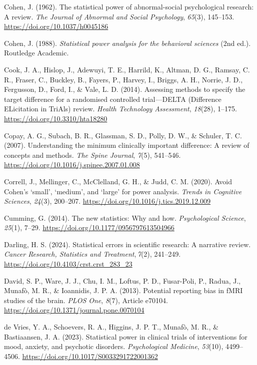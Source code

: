 \documentclass[authordate, meta, issue]{jote-new-article}
\begin{document}
	Cohen, J. (1962). The statistical power of abnormal-social psychological research: A review. \emph{The Journal of Abnormal and Social Psychology}, \emph{65}(3), 145--153. \url{https://doi.org/10.1037/h0045186}



	Cohen, J. (1988). \emph{Statistical power analysis for the behavioral sciences} (2nd ed.). Routledge Academic.



	Cook, J. A., Hislop, J., Adewuyi, T. E., Harrild, K., Altman, D. G., Ramsay, C. R., Fraser, C., Buckley, B., Fayers, P., Harvey, I., Briggs, A. H., Norrie, J. D., Fergusson, D., Ford, I., \& Vale, L. D. (2014). Assessing methods to specify the target difference for a randomised controlled trial—DELTA (Difference ELicitation in TriAls) review. \emph{Health Technology Assessment}, \emph{18}(28), 1--175. \url{https://doi.org/10.3310/hta18280}



	Copay, A. G., Subach, B. R., Glassman, S. D., Polly, D. W., \& Schuler, T. C. (2007). Understanding the minimum clinically important difference: A review of concepts and methods. \emph{The Spine Journal}, \emph{7}(5), 541--546. \url{https://doi.org/10.1016/j.spinee.2007.01.008}



	Correll, J., Mellinger, C., McClelland, G. H., \& Judd, C. M. (2020). Avoid Cohen's ‘small', ‘medium', and ‘large' for power analysis. \emph{Trends in Cognitive Sciences}, \emph{24}(3), 200--207. \url{https://doi.org/10.1016/j.tics.2019.12.009}



	Cumming, G. (2014). The new statistics: Why and how. \emph{Psychological Science}, \emph{25}(1), 7--29. \url{https://doi.org/10.1177/0956797613504966}



	Darling, H. S. (2024). Statistical errors in scientific research: A narrative review. \emph{Cancer Research, Statistics and Treatment}, \emph{7}(2), 241--249. \url{https://doi.org/10.4103/crst.crst\_283\_23}



	David, S. P., Ware, J. J., Chu, I. M., Loftus, P. D., Fusar-Poli, P., Radua, J., Munafò, M. R., \& Ioannidis, J. P. A. (2013). Potential reporting bias in fMRI studies of the brain. \emph{PLOS One}, \emph{8}(7), Article e70104. \url{https://doi.org/10.1371/journal.pone.0070104}



	de Vries, Y. A., Schoevers, R. A., Higgins, J. P. T., Munafò, M. R., \& Bastiaansen, J. A. (2023). Statistical power in clinical trials of interventions for mood, anxiety, and psychotic disorders. \emph{Psychological Medicine}, \emph{53}(10), 4499--4506. \url{https://doi.org/10.1017/S0033291722001362}
\end{document}
